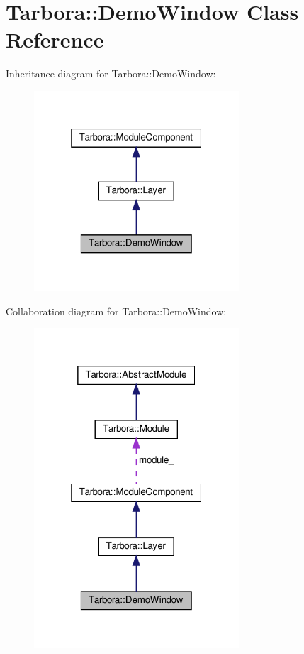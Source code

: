 \hypertarget{classTarbora_1_1DemoWindow}{}\section{Tarbora\+:\+:Demo\+Window Class Reference}
\label{classTarbora_1_1DemoWindow}


Inheritance diagram for Tarbora\+:\+:Demo\+Window\+:
\nopagebreak
\begin{figure}[H]
\begin{center}
\leavevmode
\includegraphics[width=217pt]{classTarbora_1_1DemoWindow__inherit__graph}
\end{center}
\end{figure}


Collaboration diagram for Tarbora\+:\+:Demo\+Window\+:
\nopagebreak
\begin{figure}[H]
\begin{center}
\leavevmode
\includegraphics[width=217pt]{classTarbora_1_1DemoWindow__coll__graph}
\end{center}
\end{figure}

